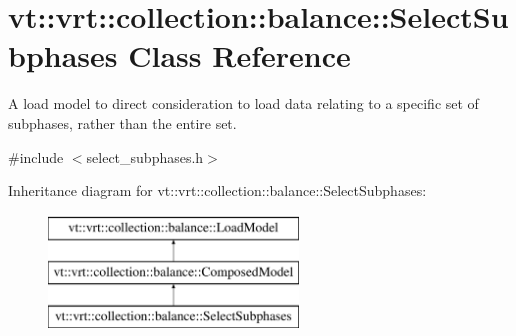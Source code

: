 \hypertarget{classvt_1_1vrt_1_1collection_1_1balance_1_1_select_subphases}{}\section{vt\+:\+:vrt\+:\+:collection\+:\+:balance\+:\+:Select\+Subphases Class Reference}
\label{classvt_1_1vrt_1_1collection_1_1balance_1_1_select_subphases}


A load model to direct consideration to load data relating to a specific set of subphases, rather than the entire set.  




{\ttfamily \#include $<$select\+\_\+subphases.\+h$>$}

Inheritance diagram for vt\+:\+:vrt\+:\+:collection\+:\+:balance\+:\+:Select\+Subphases\+:\begin{figure}[H]
\begin{center}
\leavevmode
\includegraphics[height=3.000000cm]{classvt_1_1vrt_1_1collection_1_1balance_1_1_select_subphases}
\end{center}
\end{figure}
